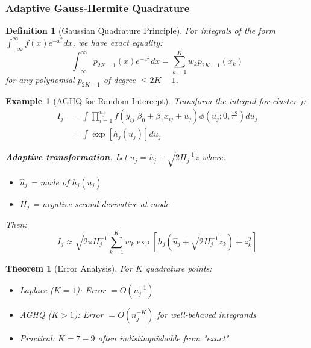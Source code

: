 \documentclass{article}
\newtheorem{definition}{Definition}
\newtheorem{theorem}{Theorem}
\newtheorem{example}{Example}
\begin{document}
\subsubsection{Adaptive Gauss-Hermite Quadrature}

\begin{definition}[Gaussian Quadrature Principle]
For integrals of the form $\int_{-\infty}^{\infty} f(x)e^{-x^2}dx$, we have exact equality:
\begin{equation}
\int_{-\infty}^{\infty} p_{2K-1}(x)e^{-x^2}dx = \sum_{k=1}^K w_k p_{2K-1}(x_k)
\end{equation}
for any polynomial $p_{2K-1}$ of degree $\leq 2K-1$.
\end{definition}

\begin{example}[AGHQ for Random Intercept]
Transform the integral for cluster $j$:
\begin{align}
I_j &= \int \prod_{i=1}^{n_j} f(y_{ij}|\beta_0 + \beta_1 x_{ij} + u_j) \phi(u_j; 0, \tau^2) du_j \\
&= \int \exp[h_j(u_j)] du_j
\end{align}

\textbf{Adaptive transformation}: Let $u_j = \hat{u}_j + \sqrt{2H_j^{-1}} z$ where:
\begin{itemize}
    \item $\hat{u}_j$ = mode of $h_j(u_j)$
    \item $H_j$ = negative second derivative at mode
\end{itemize}

Then:
\begin{equation}
I_j \approx \sqrt{2\pi H_j^{-1}} \sum_{k=1}^K w_k \exp[h_j(\hat{u}_j + \sqrt{2H_j^{-1}} z_k) + z_k^2]
\end{equation}
\end{example}

\begin{theorem}[Error Analysis]
For $K$ quadrature points:
\begin{itemize}
    \item Laplace ($K=1$): Error $= O(n_j^{-1})$
    \item AGHQ ($K>1$): Error $= O(n_j^{-K})$ for well-behaved integrands
    \item Practical: $K=7-9$ often indistinguishable from "exact"
\end{itemize}
\end{theorem}
\end{document}
